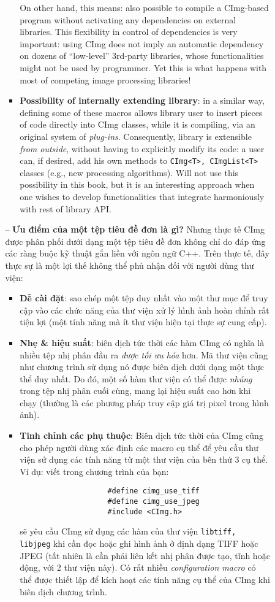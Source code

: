 \documentclass{article}
\begin{document}
\begin{itemize}
\begin{itemize}
\begin{enumerate}
\begin{itemize}
                On other hand, this means: also possible to compile a CImg-based program without activating any dependencies on external libraries. This flexibility in control of dependencies is very important: using CImg does not imply an automatic dependency on dozens of ``low-level'' 3rd-party libraries, whose functionalities might not be used by programmer. Yet this is what happens with most of competing image processing libraries!
                \item {\bf Possibility of internally extending library}: in a similar way, defining some of these macros allows library user to insert pieces of code directly into CImg classes, while it is compiling, via an original system of {\it plug-ins}. Consequently, library is extensible {\it from outside}, without having to explicitly modify its code: a user can, if desired, add his own methods to {\tt CImg<T>, CImgList<T>} classes (e.g., new processing algorithms). Will not use this possibility in this book, but it is an interesting approach when one wishes to develop functionalities that integrate harmoniously with rest of library API.
            \end{itemize}
            -- {\bf Ưu điểm của một tệp tiêu đề đơn là gì?} Nhưng thực tế CImg được phân phối dưới dạng một tệp tiêu đề đơn không chỉ do đáp ứng các ràng buộc kỹ thuật gắn liền với ngôn ngữ C++. Trên thực tế, đây thực sự là một lợi thế không thể phủ nhận đối với người dùng thư viện:
            \begin{itemize}
                \item {\bf Dễ cài đặt}: sao chép một tệp duy nhất vào một thư mục để truy cập vào các chức năng của thư viện xử lý hình ảnh hoàn chỉnh rất tiện lợi (một tính năng mà ít thư viện hiện tại thực sự cung cấp).
                \item {\bf Nhẹ \& hiệu suất}: biên dịch tức thời các hàm CImg có nghĩa là nhiều tệp nhị phân đầu ra {\it được tối ưu hóa} hơn. Mã thư viện cũng như chương trình sử dụng nó được biên dịch dưới dạng một thực thể duy nhất. Do đó, một số hàm thư viện có thể được {\it nhúng} trong tệp nhị phân cuối cùng, mang lại hiệu suất cao hơn khi chạy (thường là các phương pháp truy cập giá trị pixel trong hình ảnh).
                \item {\bf Tinh chỉnh các phụ thuộc}: Biên dịch tức thời của CImg cũng cho phép người dùng xác định các macro cụ thể để yêu cầu thư viện sử dụng các tính năng từ một thư viện của bên thứ 3 cụ thể. Ví dụ: viết trong chương trình của bạn:
                \begin{verbatim}
                    #define cimg_use_tiff
                    #define cimg_use_jpeg
                    #include <CImg.h>
                \end{verbatim}
                sẽ yêu cầu CImg sử dụng các hàm của thư viện {\tt libtiff, libjpeg} khi cần đọc hoặc ghi hình ảnh ở định dạng TIFF hoặc JPEG (tất nhiên là cần phải liên kết nhị phân được tạo, tĩnh hoặc động, với 2 thư viện này). Có rất nhiều {\it configuration macro} có thể được thiết lập để kích hoạt các tính năng cụ thể của CImg khi biên dịch chương trình.
                

\end{itemize}
\end{enumerate}
\end{itemize}
\end{itemize}
\end{document}
